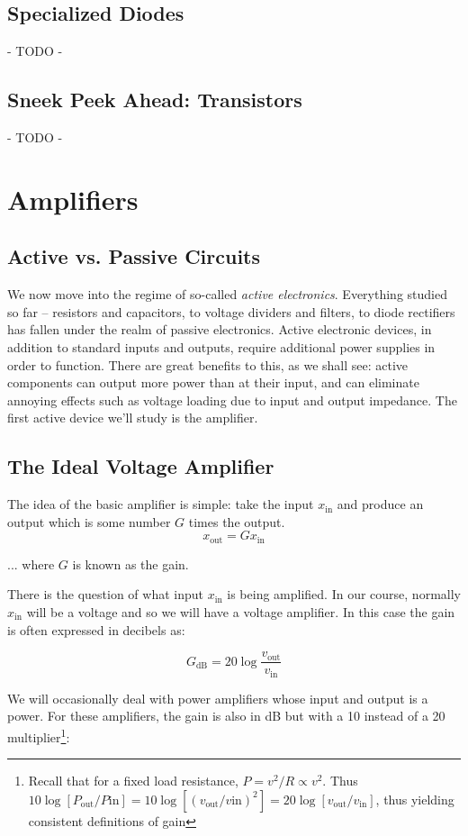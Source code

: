 \documentclass{tufte-book}
\begin{document}
\section{Specialized Diodes}
- TODO -
\section{Sneek Peek Ahead: Transistors}
- TODO -
\chapter{Amplifiers}
\section{Active vs. Passive Circuits}
We now move into the regime of so-called \textit{active electronics}. Everything studied so far -- resistors and capacitors, to voltage dividers and filters, to diode rectifiers has fallen under the realm of passive electronics. Active electronic devices, in addition to standard inputs and outputs, require additional power supplies in order to function. There are great benefits to this, as we shall see: active components can output more power than at their input, and can eliminate annoying effects such as voltage loading due to input and output impedance. The first active device we'll study is the amplifier.
\section{The Ideal Voltage Amplifier}
The idea of the basic amplifier is simple: take the input $x_\text{in}$ and produce an output which is some number $G$ times the output.
\begin{equation}
\label{eq:simple_amp}
x_\text{out} = Gx_\text{in}
\end{equation}

\noindent ... where $G$ is known as the gain.

There is the question of what input $x_\text{in}$ is being amplified. In our course, normally $x_\text{in}$ will be a voltage and so we will have a voltage amplifier. In this case the gain is often expressed in decibels as:

\begin{equation}
\label{eq:voltage_amp_dB}
G_\text{dB} = 20\log\frac{v_\text{out}}{v_\text{in}} 
\end{equation}

We will occasionally deal with power amplifiers whose input and output is a power. For these amplifiers, the gain is also in dB but with a 10 instead of a 20 multiplier\footnote{Recall that for a fixed load resistance, $P = v^2/R \propto v^2$. Thus $10\log\left[P_\text{out}/P\text{in}\right] = 10\log\left[\left(v_\text{out}/v\text{in}\right)^2\right] = 20\log\left[v_\text{out}/v_\text{in}\right]$, thus yielding consistent definitions of gain}:
\end{document}
